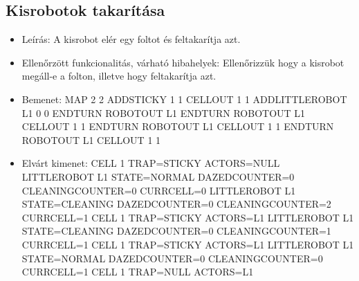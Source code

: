 \subsection{Kisrobotok takarítása}
\begin{itemize}
	\item Leírás: \newline
	A kisrobot elér egy foltot és feltakarítja azt. \newline
	\item Ellenőrzött funkcionalitás, várható hibahelyek: \newline
	Ellenőrizzük hogy a kisrobot megáll-e a folton, illetve hogy feltakarítja azt. \newline
	\item Bemenet: \newline
	MAP 2 2 \newline
	ADDSTICKY 1 1 \newline
	CELLOUT 1 1 \newline
	ADDLITTLEROBOT L1 0 0 \newline
	ENDTURN \newline
	ROBOTOUT L1 \newline
	ENDTURN \newline
	ROBOTOUT L1 \newline
	CELLOUT 1 1 \newline
	ENDTURN \newline
	ROBOTOUT L1 \newline
	CELLOUT 1 1 \newline
	ENDTURN \newline
	ROBOTOUT L1 \newline
	CELLOUT 1 1 \newline
	\item Elvárt kimenet: \newline
	CELL 1 TRAP=STICKY ACTORS=NULL \newline
	LITTLEROBOT L1 STATE=NORMAL DAZEDCOUNTER=0 CLEANINGCOUNTER=0 CURRCELL=0 \newline
	LITTLEROBOT L1 STATE=CLEANING DAZEDCOUNTER=0 CLEANINGCOUNTER=2 CURRCELL=1 \newline
	CELL 1 TRAP=STICKY ACTORS=L1 \newline
	LITTLEROBOT L1 STATE=CLEANING DAZEDCOUNTER=0 CLEANINGCOUNTER=1 CURRCELL=1 \newline
	CELL 1 TRAP=STICKY ACTORS=L1 \newline
	LITTLEROBOT L1 STATE=NORMAL DAZEDCOUNTER=0 CLEANINGCOUNTER=0 CURRCELL=1 \newline
	CELL 1 TRAP=NULL ACTORS=L1 \newline

\end{itemize}

